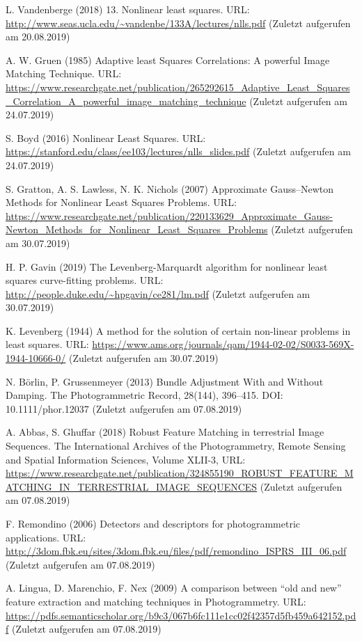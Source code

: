 \documentclass[12pt,oneside]{scrreprt}
\begin{document}
\begin{thebibliography}{10}
 L. Vandenberge (2018) 13. Nonlinear least squares. URL: \url{http://www.seas.ucla.edu/~vandenbe/133A/lectures/nlls.pdf} (Zuletzt aufgerufen am 20.08.2019)

 A. W. Gruen (1985) Adaptive least Squares Correlations:
A powerful Image Matching Technique. URL: \url{https://www.researchgate.net/publication/265292615_Adaptive_Least_Squares_Correlation_A_powerful_image_matching_technique}  (Zuletzt aufgerufen am 24.07.2019)

 S. Boyd (2016) Nonlinear Least Squares. URL: \url{https://stanford.edu/class/ee103/lectures/nlls_slides.pdf} (Zuletzt aufgerufen am 24.07.2019)

 S. Gratton, A. S. Lawless, N. K. Nichols (2007) Approximate Gauss–Newton Methods for Nonlinear Least Squares Problems. URL: \url{https://www.researchgate.net/publication/220133629_Approximate_Gauss-Newton_Methods_for_Nonlinear_Least_Squares_Problems} (Zuletzt aufgerufen am 30.07.2019)

 H. P. Gavin (2019) The Levenberg-Marquardt algorithm for
nonlinear least squares curve-fitting problems. URL: \url{http://people.duke.edu/~hpgavin/ce281/lm.pdf} (Zuletzt aufgerufen am 30.07.2019)

 K. Levenberg (1944) A method for the solution of certain non-linear problems in least squares. URL: \url{https://www.ams.org/journals/qam/1944-02-02/S0033-569X-1944-10666-0/} (Zuletzt aufgerufen am 30.07.2019)

 N. Börlin, P. Grussenmeyer (2013) Bundle Adjustment With and Without Damping. The Photogrammetric Record, 28(144), 396–415. DOI: 10.1111/phor.12037 (Zuletzt aufgerufen am 07.08.2019)

 A. Abbas, S. Ghuffar (2018) Robust Feature Matching in terrestrial Image Sequences. The International Archives of the Photogrammetry, Remote Sensing and Spatial Information Sciences, Volume XLII-3, URL: \url{https://www.researchgate.net/publication/324855190_ROBUST_FEATURE_MATCHING_IN_TERRESTRIAL_IMAGE_SEQUENCES} (Zuletzt aufgerufen am 07.08.2019)

 F. Remondino (2006) Detectors and descriptors for photogrammetric applications. URL: \url{http://3dom.fbk.eu/sites/3dom.fbk.eu/files/pdf/remondino_ISPRS_III_06.pdf} (Zuletzt aufgerufen am 07.08.2019)

 A. Lingua, D. Marenchio, F. Nex (2009) A comparison between “old and new” feature extraction and matching techniques in Photogrammetry. URL: \url{https://pdfs.semanticscholar.org/b9c3/067b6fc111e1cc02f42357d5fb459a642152.pdf} (Zuletzt aufgerufen am 07.08.2019)


\end{thebibliography}
\end{document}
